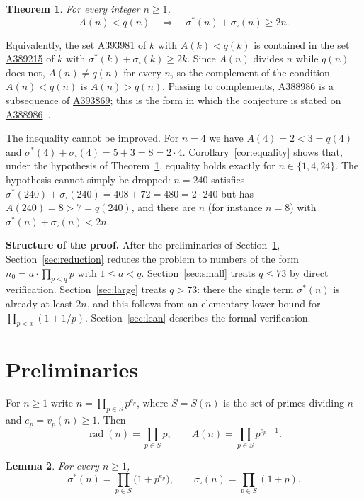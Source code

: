 \documentclass[11pt,a4paper]{amsart}
\newtheorem{theorem}{Theorem}[section]
\newtheorem{lemma}[theorem]{Lemma}
\theoremstyle{definition}
\theoremstyle{remark}
\newcommand{\usig}{\sigma^{*}}
\newcommand{\ssq}{\sigma_{\square}}
\newcommand{\rad}{\operatorname{rad}}
\newcommand{\oeis}[1]{\href{https://oeis.org/#1}{#1}}
\begin{document}
\begin{theorem}\label{thm:main}
For every integer $n \ge 1$,
\[
  A(n) < q(n) \quad\Longrightarrow\quad \usig(n) + \ssq(n) \ge 2n .
\]
\end{theorem}

Equivalently, the set \oeis{A393981} of $k$ with $A(k)<q(k)$ is contained in the set \oeis{A389215} of $k$ with $\usig(k)+\ssq(k)\ge 2k$. Since $A(n)$ divides $n$ while $q(n)$ does not, $A(n)\ne q(n)$ for every $n$, so the complement of the condition $A(n)<q(n)$ is $A(n)>q(n)$. Passing to complements, \oeis{A388986} is a subsequence of \oeis{A393869}; this is the form in which the conjecture is stated on \oeis{A388986}~\cite{A388986}.

The inequality cannot be improved. For $n=4$ we have $A(4)=2<3=q(4)$ and $\usig(4)+\ssq(4) = 5+3 = 8 = 2\cdot 4$. Corollary~\ref{cor:equality} shows that, under the hypothesis of Theorem~\ref{thm:main}, equality holds exactly for $n \in \{1, 4, 24\}$. The hypothesis cannot simply be dropped: $n=240$ satisfies $\usig(240)+\ssq(240) = 408+72 = 480 = 2\cdot 240$ but has $A(240)=8>7=q(240)$, and there are $n$ (for instance $n=8$) with $\usig(n)+\ssq(n) < 2n$.

\medskip
\noindent\textbf{Structure of the proof.} After the preliminaries of Section~\ref{sec:prelim}, Section~\ref{sec:reduction} reduces the problem to numbers of the form $n_0 = a\cdot\prod_{p<q}p$ with $1 \le a < q$. Section~\ref{sec:small} treats $q \le 73$ by direct verification. Section~\ref{sec:large} treats $q>73$: there the single term $\usig(n)$ is already at least $2n$, and this follows from an elementary lower bound for $\prod_{p<x}(1+1/p)$. Section~\ref{sec:lean} describes the formal verification.

\section{Preliminaries}\label{sec:prelim}

For $n \ge 1$ write $n = \prod_{p \in S} p^{e_p}$, where $S = S(n)$ is the set of primes dividing $n$ and $e_p = v_p(n) \ge 1$. Then
\[
  \rad(n) = \prod_{p\in S} p, \qquad A(n) = \prod_{p \in S} p^{e_p-1}.
\]

\begin{lemma}\label{lem:products}
For every $n \ge 1$,
\[
  \usig(n) = \prod_{p \in S}\bigl(1+p^{e_p}\bigr), \qquad \ssq(n) = \prod_{p\in S}(1+p).
\]
\end{lemma}
\end{document}
